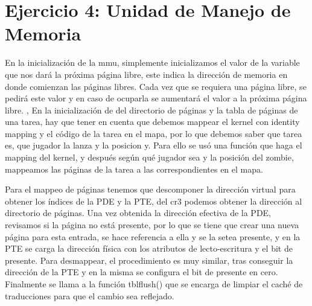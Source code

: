 \section{Ejercicio 4: Unidad de Manejo de Memoria}
En la inicialización de la mmu, simplemente inicializamos el valor de la variable que nos dará la próxima página libre, este indica la dirección de memoria en donde comienzan las páginas libres. Cada vez que se requiera una página libre, se pedirá este valor y en caso de ocuparla se aumentará el valor a la próxima página libre.
, 
En la inicialización de del directorio de páginas y la tabla de páginas de una tarea, hay que tener en cuenta que debemos mappear el kernel con identity mapping y el código de la tarea en el mapa, por lo que debemos saber que tarea es, que jugador la lanza y la posicion y. Para ello se usó una función que haga el mapping del kernel, y después según qué jugador sea y la posición del zombie, mappeamos las páginas de la tarea a las correspondientes en el mapa.

Para el mappeo de páginas tenemos que descomponer la dirección virtual para obtener los índices de la PDE y la PTE, del cr3 podemos obtener la dirección al directorio de páginas. Una vez obtenida la dirección efectiva de la PDE, revisamos si la página no está presente, por lo que se tiene que crear una nueva página para esta entrada, se hace referencia a ella y se la setea presente, y en la PTE se carga la dirección física con los atributos de lecto-escritura y el bit de presente. Para desmappear, el procedimiento es muy similar, tras conseguir la dirección de la PTE y en la misma se configura el bit de presente en cero. Finalmente se llama a la función tblflush() que se encarga de limpiar el caché de traducciones para que el cambio sea reflejado.
